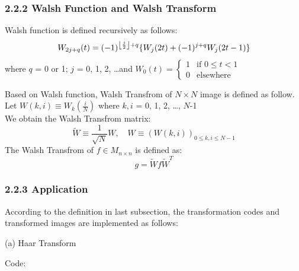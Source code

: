 \documentclass[12pt]{article}
\DeclarePairedDelimiter\floor{\lfloor}{\rfloor}
\begin{document}
\subsubsection*{2.2.2 \quad Walsh Function and Walsh Transform}
Walsh function is defined recursively as follows: 
\begin{equation*}
    W_{2j+q}(t) = (-1)^{\floor*{\frac{j}{2}}+q} \{W_j(2t)+(-1)^{j+q}W_j(2t-1)\}
\end{equation*} 
where $q$ = 0 or 1; $j$ = 0, 1, 2, \dots and $W_0(t) = \begin{cases}
        1 & \text{if $0 \leq t < 1$}\\
        0 & \text{elsewhere}
    \end{cases}$\\
\begin{flushleft}
Based on Walsh function, Walsh Transfrom of $N\times N$ image is defined as follow.\\
Let $W(k,i) \equiv W_{k}\left(\frac{i}{N}\right)$ where $k,i$ = 0, 1, 2, \ldots, $N$-1 \\
We obtain the Walsh Transfrom matrix:
\begin{equation*}
 \tilde{W} \equiv\frac{1}{\sqrt{N}}W, \quad W \equiv(W (k,i))_{0\leqslant k,i \leqslant N-1}
\end{equation*}
The Walsh Transfrom of $f \in M_{n\times n}$ is defined as:
\begin{equation*}
    g = \tilde{W}f\tilde{W}^T
\end{equation*}
\end{flushleft} 

\subsubsection*{2.2.3 \quad Application}
According to the definition in last subsection, the transformation codes and transformed images are implemented as follows:
\begin{flushleft}
(a) Haar Transform 

Code:
\end{flushleft}
\end{document}

